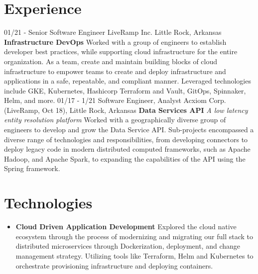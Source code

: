 \documentclass[]{friggeri-cv}
\begin{document}
\section{Experience}
\begin{entrylist}
  \entry
    {01/21 - }
    {Senior Software Engineer}
    {LiveRamp Inc. Little Rock, Arkansas}
    {\textbf{Infrastructure DevOps} Worked with a group of engineers to establish developer best practices, while supporting cloud infrastructure for the entire organization. As a team, create and maintain building blocks of cloud infrastructure to empower teams to create and deploy infrastructure and applications in a safe, repeatable, and compliant manner. Leveraged technologies include GKE, Kubernetes, Hashicorp Terraform and Vault, GitOps, Spinnaker, Helm, and more.}
  \entry
    {01/17 - 1/21}
    {Software Engineer, Analyst}
    {Acxiom Corp. (LiveRamp, Oct 18), Little Rock, Arkansas}
    {\textbf{Data Services API} \textit{A low latency entity resolution platform} Worked with a geographically diverse group of engineers to develop and grow the Data Service API. Sub-projects encompassed a diverse range of technologies and responsibilities, from developing connectors to deploy legacy code in modern distributed computed frameworks, such as Apache Hadoop, and Apache Spark, to expanding the capabilities of the API using the Spring framework. }
\end{entrylist}

\section{Technologies}
\begin{itemize}
    \item
      {\textbf{Cloud Driven Application Development} Explored the cloud native ecosystem through the process of modernizing and migrating our full stack to distributed microservices through Dockerization, deployment, and change management strategy. Utilizing tools like Terraform, Helm and Kubernetes to orchestrate provisioning infrastructure and deploying containers. }
\end{itemize}
\end{document}
